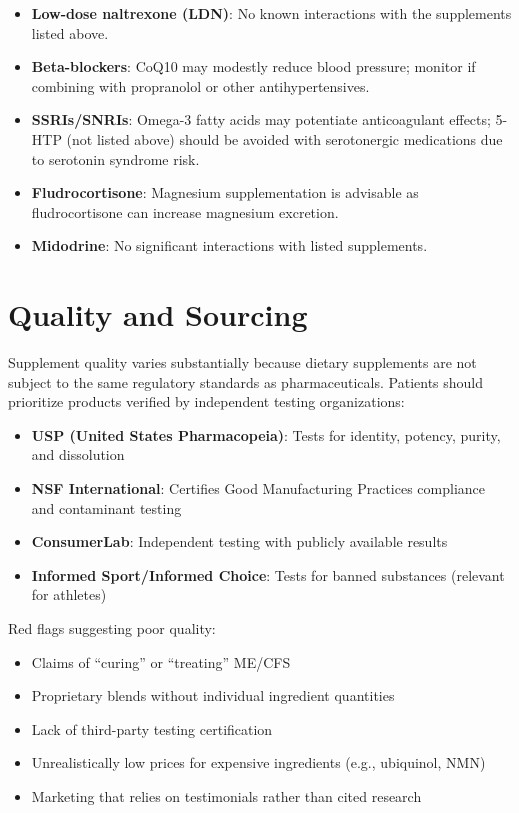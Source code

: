 \begin{itemize}
    \item \textbf{Low-dose naltrexone (LDN)}: No known interactions with the supplements listed above.
    \item \textbf{Beta-blockers}: CoQ10 may modestly reduce blood pressure; monitor if combining with propranolol or other antihypertensives.
    \item \textbf{SSRIs/SNRIs}: Omega-3 fatty acids may potentiate anticoagulant effects; 5-HTP (not listed above) should be avoided with serotonergic medications due to serotonin syndrome risk.
    \item \textbf{Fludrocortisone}: Magnesium supplementation is advisable as fludrocortisone can increase magnesium excretion.
    \item \textbf{Midodrine}: No significant interactions with listed supplements.
\end{itemize}

\section{Quality and Sourcing}
\label{sec:quality-sourcing}

Supplement quality varies substantially because dietary supplements are not subject to the same regulatory standards as pharmaceuticals. Patients should prioritize products verified by independent testing organizations:

\begin{itemize}
    \item \textbf{USP (United States Pharmacopeia)}: Tests for identity, potency, purity, and dissolution
    \item \textbf{NSF International}: Certifies Good Manufacturing Practices compliance and contaminant testing
    \item \textbf{ConsumerLab}: Independent testing with publicly available results
    \item \textbf{Informed Sport/Informed Choice}: Tests for banned substances (relevant for athletes)
\end{itemize}

Red flags suggesting poor quality:

\begin{itemize}
    \item Claims of ``curing'' or ``treating'' ME/CFS
    \item Proprietary blends without individual ingredient quantities
    \item Lack of third-party testing certification
    \item Unrealistically low prices for expensive ingredients (e.g., ubiquinol, NMN)
    \item Marketing that relies on testimonials rather than cited research
\end{itemize}

